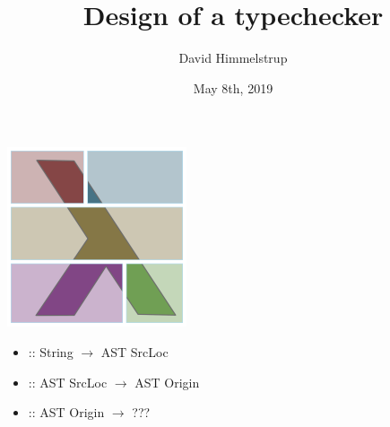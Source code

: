 \documentclass[pdf]{beamer}
\title{Design of a typechecker}
\author{David Himmelstrup}
\date{May 8th, 2019}
\begin{document}
\begin{frame}
  \titlepage
\end{frame}

\begin{frame}
  \begin{center}
    \includegraphics[scale=0.5]{haskell-suite.png}
  \end{center}
\end{frame}

\begin{frame}
  \begin{itemize}
    \item {} :: String $\rightarrow$ AST SrcLoc
    \item {} :: AST SrcLoc $\rightarrow$ AST Origin
    \item {} :: AST Origin $\rightarrow$ ???
  \end{itemize}
\end{frame}
\end{document}
